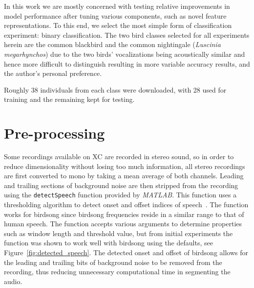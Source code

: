 In this work we are mostly concerned with testing relative improvements in model
performance after tuning various components, such as novel feature
representations. To this end, we select the most simple form of classification
experiment: binary classification. The two bird classes selected for all
experiments herein are the common blackbird and the common nightingale
(\textit{Luscinia megarhynchos}) due to the two birds' vocalizations being
acoustically similar and hence more difficult to distinguish resulting in more
variable accuracy results, and the author's personal preference.

Roughly 38 individuals from each class were downloaded, with 28 used for
training and the remaining kept for testing.

\section{Pre-processing}

Some recordings available on XC are recorded in stereo sound, so in order to
reduce dimensionality without losing too much information, all stereo recordings
are first converted to mono by taking a mean average of both channels. Leading
and trailing sections of background noise are then stripped from the recording
using the \texttt{detectSpeech} function provided by \textit{MATLAB}. This
function uses a thresholding algorithm to detect onset and offset indices of
speech~\cite{giannakopoulos2009method}. The function works for birdsong since
birdsong frequencies reside in a similar range to that of human speech. The
function accepts various arguments to determine properties such as window length
and threshold value, but from initial experiments the function was shown to
work well with birdsong using the defaults, see Figure~\ref{fig:detected_speech}.
The detected onset and offset of birdsong allows for the leading and trailing
bits of background noise to be removed from the recording, thus reducing
unnecessary computational time in segmenting the audio.

